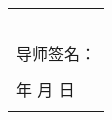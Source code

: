 \begin{table}[H]
\begin{tabular}{|llllll|}
		\multicolumn{6}{|p{35.88em}|}{\quad\quad\mentorcomment} \\
		\multicolumn{6}{|c|}{} \\
		\multicolumn{6}{|c|}{} \\
		\multicolumn{6}{|c|}{} \\
		\multicolumn{6}{|c|}{} \\
		\multicolumn{6}{|p{35.88em}|}{                                                                             \hfill 导师签名：\qquad\qquad\qquad\qquad\qquad\qquad\qquad\qquad } \\
		\multicolumn{6}{|c|}{} \\
		\multicolumn{6}{|p{35.88em}|}{\hfill 年 \qquad\quad 月 \qquad\quad 日 \qquad\qquad\qquad} \\
		\multicolumn{6}{|r|}{} \\
		\hline
	\end{tabular}
\end{table}

\renewcommand\arraystretch{1}
\restoregeometry

